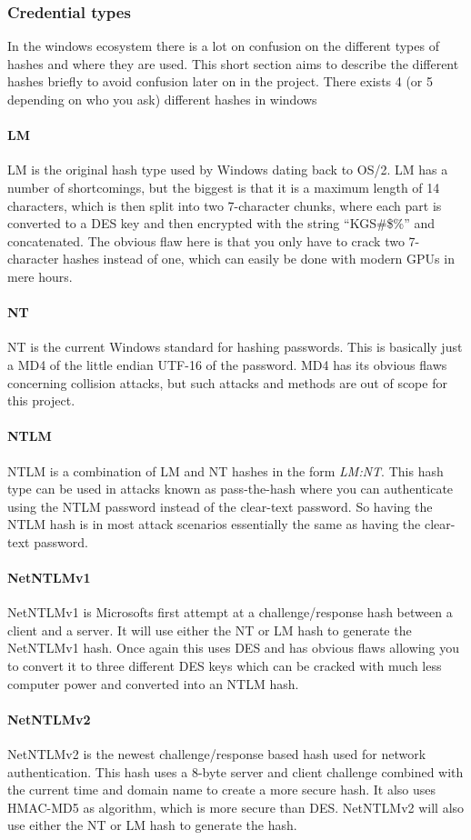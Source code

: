 \documentclass{article}
\begin{document}
\subsubsection{Credential types}
\label{sec:credential-types}
In the windows ecosystem there is a lot on confusion on the different types of hashes and where they are used. This short section aims to describe the different hashes briefly to avoid confusion later on in the project. There exists 4 (or 5 depending on who you ask) different hashes in windows\cite{url:hashes:hash-types}
\paragraph{LM}
LM is the original hash type used by Windows dating back to OS/2. LM has a number of shortcomings, but the biggest is that it is a maximum length of 14 characters, which is then split into two 7-character chunks, where each part is converted to a DES key and then encrypted with the string ``KGS\!\@\#\$\%'' and concatenated. The obvious flaw here is that you only have to crack two 7-character hashes instead of one, which can easily be done with modern GPUs in mere hours.
\paragraph{NT}
NT is the current Windows standard for hashing passwords. This is basically just a MD4 of the little endian UTF-16 of the password. MD4 has its obvious flaws concerning collision attacks, but such attacks and methods are out of scope for this project.
\paragraph{NTLM}
NTLM is a combination of LM and NT hashes in the form \emph{LM:NT}. This hash type can be used in attacks known as pass-the-hash\cite{url:microsoft:pass-the-hash-mitigation} where you can authenticate using the NTLM password instead of the clear-text password. So having the NTLM hash is in most attack scenarios essentially the same as having the clear-text password.
\paragraph{NetNTLMv1}
NetNTLMv1 is Microsofts first attempt at a challenge/response hash between a client and a server. It will use either the NT or LM hash to generate the NetNTLMv1 hash. Once again this uses DES and has obvious flaws allowing you to convert it to three different DES keys which can be cracked with much less computer power and converted into an NTLM hash\cite{url:hashes:netntlmv1-to-ntlm}.
\paragraph{NetNTLMv2}
NetNTLMv2 is the newest challenge/response based hash used for network authentication. This hash uses a 8-byte server and client challenge combined with the current time and domain name to create a more secure hash. It also uses HMAC-MD5 as algorithm, which is more secure than DES. NetNTLMv2 will also use either the NT or LM hash to generate the hash.

\end{document}
